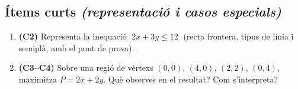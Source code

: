 \subsection*{Ítems curts \hfill \normalfont\itshape (representació i casos especials)}

\begin{enumerate}[label=\textbf{\arabic*.}, leftmargin=2em, itemsep=7pt, start=5]
  \item \textbf{(C2)} Representa la inequació $\;2x+3y\le 12\;$ (recta frontera, tipus
        de línia i semiplà, amb el punt de prova).
  \item \textbf{(C3--C4)} Sobre una regió de vèrtexs $(0,0)$, $(4,0)$, $(2,2)$, $(0,4)$,
        maximitza $P=2x+2y$. Què observes en el resultat? Com s'interpreta?
\end{enumerate}

